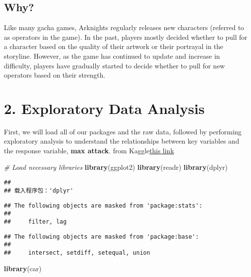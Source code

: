 \documentclass[
]{article}
\newenvironment{Shaded}{\begin{snugshade}}{\end{snugshade}}
\newcommand{\CommentTok}[1]{\textcolor[rgb]{0.56,0.35,0.01}{\textit{#1}}}
\newcommand{\FunctionTok}[1]{\textcolor[rgb]{0.13,0.29,0.53}{\textbf{#1}}}
\newcommand{\NormalTok}[1]{#1}
\begin{document}
\subsection{Why?}\label{why}

Like many gacha games, Arknights regularly releases new characters
(referred to as operators in the game). In the past, players mostly
decided whether to pull for a character based on the quality of their
artwork or their portrayal in the storyline. However, as the game has
continued to update and increase in difficulty, players have gradually
started to decide whether to pull for new operators based on their
strength.

\section{2. Exploratory Data Analysis}\label{exploratory-data-analysis}

First, we will load all of our packages and the raw data, followed by
performing exploratory analysis to understand the relationships between
key variables and the response variable, \textbf{max attack}. from
Kaggle\href{https://www.kaggle.com/datasets/victorsoeiro/arknights-operators/data}{this
link}

\begin{Shaded}
\begin{Highlighting}[]
\CommentTok{\# Load necessary libraries}
\FunctionTok{library}\NormalTok{(ggplot2)}
\FunctionTok{library}\NormalTok{(readr)}
\FunctionTok{library}\NormalTok{(dplyr)}
\end{Highlighting}
\end{Shaded}

\begin{verbatim}
## 
## 载入程序包：'dplyr'
\end{verbatim}

\begin{verbatim}
## The following objects are masked from 'package:stats':
## 
##     filter, lag
\end{verbatim}

\begin{verbatim}
## The following objects are masked from 'package:base':
## 
##     intersect, setdiff, setequal, union
\end{verbatim}

\begin{Shaded}
\begin{Highlighting}[]
\FunctionTok{library}\NormalTok{(car)}
\end{Highlighting}
\end{Shaded}
\end{document}

